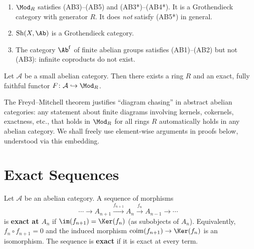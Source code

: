 \begin{example}\label{ex:grothendieck-cat}
\begin{enumerate}
    \item $\Mod_R$ satisfies (AB3)--(AB5) and (AB3*)--(AB4*). It is a Grothendieck category
    with generator $R$. It does \emph{not} satisfy (AB5*) in general.
    \item $\operatorname{Sh}(X, \Ab)$ is a Grothendieck category.
    \item The category $\Ab^{\mathrm{f}}$ of finite abelian groups satisfies (AB1)--(AB2)
    but not (AB3): infinite coproducts do not exist.
\end{enumerate}
\end{example}

\begin{theorem}\label{thm:freyd-mitchell}
Let $\mathcal{A}$ be a small abelian category. Then there exists a ring $R$ and an
exact, fully faithful functor $F \colon \mathcal{A} \hookrightarrow \Mod_R$.
\end{theorem}

\begin{remark}\label{rem:freyd-mitchell}
The Freyd--Mitchell theorem justifies ``diagram chasing'' in abstract abelian categories:
any statement about finite diagrams involving kernels, cokernels, exactness, etc., that
holds in $\Mod_R$ for all rings $R$ automatically holds in any abelian category.
We shall freely use element-wise arguments in proofs below, understood via this embedding.
\end{remark}


\section{Exact Sequences}\label{sec:exact-seq}

\begin{definition}\label{def:exact-seq}
Let $\mathcal{A}$ be an abelian category. A sequence of morphisms
\[
    \cdots \longrightarrow A_{n+1} \xrightarrow{f_{n+1}} A_n \xrightarrow{f_n} A_{n-1}
    \longrightarrow \cdots
\]
is \textbf{exact at $A_n$} if $\im(f_{n+1}) = \Ker(f_n)$ (as subobjects of $A_n$).
Equivalently, $f_n \circ f_{n+1} = 0$ and the induced morphism
$\operatorname{coim}(f_{n+1}) \to \Ker(f_n)$ is an isomorphism.
The sequence is \textbf{exact} if it is exact at every term.
\end{definition}

